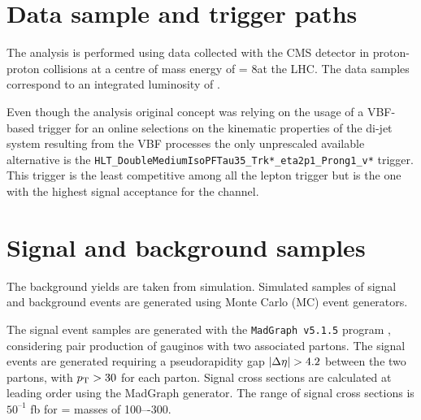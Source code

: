 

\section {Data sample and trigger paths}


The analysis is performed using data collected with the CMS detector
in proton-proton collisions at a centre of mass energy of \CM = 8\tev at the LHC. The data samples correspond to an integrated luminosity of \lumiOld. 

Even though the analysis original concept was relying on the usage of a VBF-based trigger for an online selections on the kinematic properties of the di-jet system resulting from the VBF processes the only unprescaled available alternative is the \texttt{HLT\_DoubleMediumIsoPFTau35\_Trk*\_eta2p1\_Prong1\_v*} trigger. This trigger is the least competitive among all the lepton trigger but is the one with the highest signal acceptance for the \hadtau channel.

\section{Signal and background samples}



The background yields are taken from simulation. Simulated samples of signal and background events are generated using Monte Carlo (MC) event generators.

The signal event samples are generated with the \texttt{MadGraph v5.1.5} program \cite{Alwall:2011uj}, considering pair production of gauginos with two associated partons. The signal events are generated requiring a pseudorapidity gap $|\Delta\eta| > 4.2$ between the two partons, with $p_{\text{T}} > 30$ \pt for each parton. Signal cross sections are calculated at leading order using the MadGraph generator. The range of signal cross sections is $50^{–1}$ fb for \charginopm = \neutralinotwo masses of 100–-300\gev.

